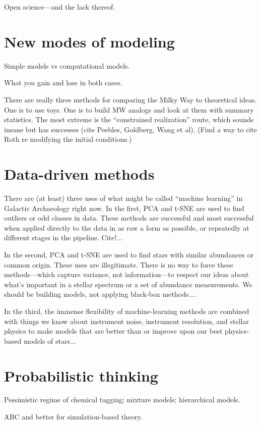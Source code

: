 \documentclass[11pt, letterpaper]{article}
\begin{document}
Open science---and the lack thereof.

\section{New modes of modeling}

Simple models vs computational models.

What you gain and lose in both cases.

There are really three methods for comparing the Milky Way to
theoretical ideas. One is to use toys. One is to build MW analogs and
look at them with summary statistics. The most extreme is the
``constrained realization'' route, which sounds insane but has
successes (cite Peebles, Goldberg, Wang et al).  (Find a way to cite
Roth re modifying the initial conditions.)

\section{Data-driven methods}

There are (at least) three uses of what might be called ``machine learning''
in Galactic Archaeology right now. In the first, PCA and t-SNE are used to
find outliers or odd classes in data. These methods are successful and most
successful when applied directly to the data in as raw a form as possible, or
repeatedly at different stages in the pipeline. Cite!...

In the second, PCA and t-SNE are used to find stars with similar
abundances or common origin. These uses are illegitimate. There is no
way to force these methods---which capture variance, not
information---to respect our ideas about what's important in a stellar
spectrum or a set of abundance measurements. We should be building
models, not applying black-box methods....

In the third, the immense flexibility of machine-learning methods are
combined with things we know about instrument noise, instrument
resolution, and stellar physics to make models that are better than or
improve upon our best physics-based models of stars...

\section{Probabilistic thinking}

Pessimistic regime of chemical tagging; mixture models; hierarchical models.

ABC and better for simulation-based theory.
\end{document}
